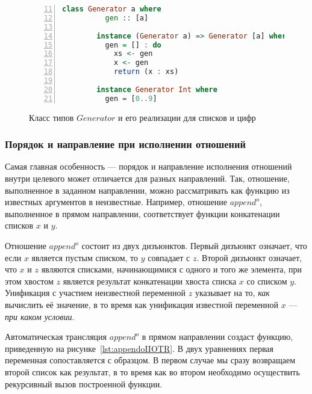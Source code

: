 \begin{figure}[h!]
  \begin{center}
  \begin{minipage}{0.7\textwidth}
  \begin{lstlisting}[language=Haskell, frame=single, numbers=left,numberstyle=\small, firstnumber=11, escapechar=|]
        class Generator a where
          gen :: [a]
        
        instance (Generator a) => Generator [a] where
          gen = [] : do
            xs <- gen
            x <- gen
            return (x : xs)
        
        instance Generator Int where
          gen = [0..9]
    \end{lstlisting}
  \end{minipage}
  \end{center}
  \caption{Класс типов $Generator$ и его реализации для списков и цифр}
  \label{lst:generator}
\end{figure}


\subsubsection{Порядок и направление при исполнении отношений}

Самая главная особенность --- порядок и направление исполнения отношений внутри целевого может отличается для разных направлений.
Так, отношение, выполненное в заданном направлении, можно рассматривать как функцию из известных аргументов в неизвестные. 
Например, отношение $append^o$, выполненное в прямом направлении, соответствует функции конкатенации списков $x$ и $y$.

Отношение $append^o$ состоит из двух дизъюнктов. 
Первый дизъюнкт означает, что если $x$ является пустым списком, то $y$ совпадает с $z$. 
Второй дизъюнкт означает, что $x$ и $z$ являются списками, начинающимися с одного и того же элемента, при этом хвостом $z$ является результат конкатенации хвоста списка $x$ со списком $y$. 
Унификация с участием неизвестной переменной $z$ указывает на то, \emph{как} вычислить её значение, в то время как унификация известной переменной $x$ --- \emph{при каком условии}.

Автоматическая трансляция $append^o$ в прямом направлении создаст функцию, приведенную на рисунке~\ref{lst:appendoIIOTR}.
В двух уравнениях первая переменная сопоставляется с образцом. 
В первом случае мы сразу возвращаем второй список как результат, в то время как во втором необходимо осуществить рекурсивный вызов построенной функции. 

